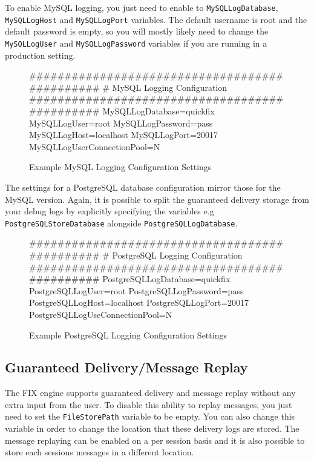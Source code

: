 To enable MySQL logging, you just need to enable to \verb|MySQLLogDatabase|, \verb|MySQLLogHost| and \verb|MySQLLogPort| variables. The default username is root and the default password is empty, so you will mostly likely need to change the \verb|MySQLLogUser| and \verb|MySQLLogPassword| variables if you are running in a production setting.

\begin{figure}[H]
\begin{inicode}
	##############################################
	#       MySQL Logging Configuration 
	##############################################
	MySQLLogDatabase=quickfix
	MySQLLogUser=root
	MySQLLogPassword=pass
	MySQLLogHost=localhost
	MySQLLogPort=20017
	MySQLLogUserConnectionPool=N
\end{inicode}
\caption{Example MySQL Logging Configuration Settings}
\end{figure}

The settings for a PostgreSQL database configuration mirror those for the MySQL
version. Again, it is possible to split the guaranteed delivery storage from your
debug logs by explicitly specifying the variables e.g \verb|PostgreSQLStoreDatabase|
alongside \verb|PostgreSQLLogDatabase|.

\begin{figure}[H]
\begin{inicode}
	##############################################
	#       PostgreSQL Logging Configuration 
	##############################################
	PostgreSQLLogDatabase=quickfix
	PostgreSQLLogUser=root
	PostgreSQLLogPassword=pass
	PostgreSQLLogHost=localhost
	PostgreSQLLogPort=20017
	PostgreSQLLogUseConnectionPool=N
\end{inicode}
\caption{Example PostgreSQL Logging Configuration Settings}
\end{figure}

\subsection{Guaranteed Delivery/Message Replay}

The FIX engine supports guaranteed delivery and message replay without any extra input from the user. To disable this ability to replay messages, you just need to set the \verb|FileStorePath| variable to be empty. You can also change this variable in order to change the location that these delivery logs are stored. The message replaying can be enabled on a per session basis and it is also possible to store each sessions messages in a different location.

